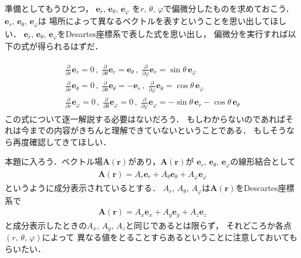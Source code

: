 準備としてもうひとつ，
$\bm{e}_r, \, \bm{e}_{\theta}, \, \bm{e}_\varphi$
を$r, \, \theta, \, \varphi$で偏微分したものを求めておこう．
$\bm{e}_r, \, \bm{e}_{\theta}, \, \bm{e}_\varphi$は
場所によって異なるベクトルを表すということを思い出してほしい．
$\bm{e}_r, \, \bm{e}_{\theta}, \, \bm{e}_\varphi$をDesartes座標系で表した式を思い出し，
偏微分を実行すれば以下の式が得られるはずだ．

\begin{align}
\begin{aligned}
\frac{\partial}{\partial r } \bm{e}_r = 0 
\, , \; \frac{\partial}{\partial \theta} \bm{e}_r = \bm{e}_\theta 
\, , \; \frac{\partial}{\partial \varphi} \bm{e}_r = \sin \theta \, \bm{e}_\varphi \\
\frac{\partial}{\partial r} \bm{e}_\theta = 0 
\, , \; \frac{\partial}{\partial \theta} \bm{e}_\theta = - \bm{e}_r 
\, , \; \frac{\partial}{\partial \varphi} \bm{e}_\theta = \cos \theta \, \bm{e}_\varphi \\
\frac{\partial}{\partial r} \bm{e}_\varphi = 0 
\, , \; \frac{\partial}{\partial \theta} \bm{e}_\varphi = 0
\, , \; \frac{\partial}{\partial \varphi} \bm{e}_\varphi 
= - \sin \theta \, \bm{e}_r - \cos \theta \, \bm{e}_\theta
 \end{aligned}
 \label{eq:kyokukiteibibun}
 \end{align}
この式について逐一解説する必要はないだろう．
もしわからないのであればそれは今までの内容がきちんと理解できていないということである．
もしそうなら再度確認してきてほしい．

本題に入ろう．ベクトル場$\bm{A}(\bm{r})$があり，$\bm{A}(\bm{r})$が
$\bm{e}_r , \, \bm{e}_{\theta}, \, \bm{e}_{\varphi}$の線形結合として
\begin{align}
\bm{A}(\bm{r}) = A_r \bm{e}_r + A_\theta \bm{e}_\theta + A_\varphi \bm{e}_\varphi
\label{eq:vecseibunkyoku}
\end{align}
というように成分表示されているとする．
$A_r, \, A_\theta, \, A_\varphi$は$\bm{A}(\bm{r})$をDescartes座標系で
\begin{align}
\bm{A}(\bm{r}) = A_x \bm{e}_x + A_y \bm{e}_y + A_z \bm{e}_z 
\label{eq:vecseibunDes}
\end{align}
と成分表示したときの$A_x, \, A_y, \, A_z$と同じであるとは限らず，
それどころか各点$(r, \, \theta, \, \varphi)$によって
異なる値をとることすらあるということに注意しておいてもらいたい．

